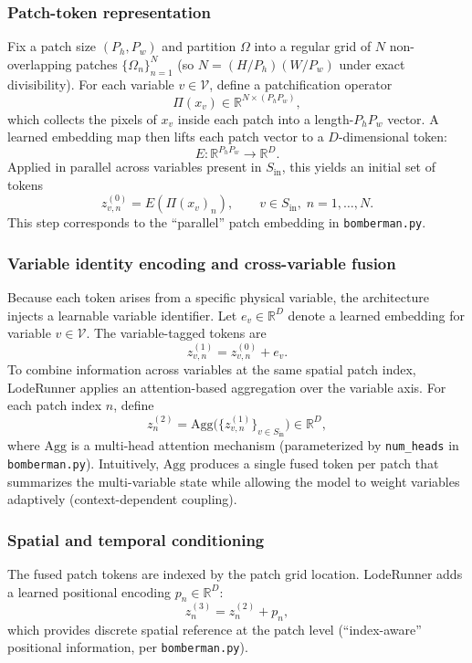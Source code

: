 \documentclass{article} %
\begin{document}
\subsubsection{Patch-token representation}
\label{subsec:patch_token_math}
Fix a patch size $(P_h,P_w)$ and partition $\Omega$ into a regular grid of $N$ non-overlapping patches $\{ \Omega_n \}_{n=1}^N$ (so $N=(H/P_h)(W/P_w)$ under exact divisibility). For each variable $v\in \mathcal{V}$, define a patchification operator
\[
\Pi(x_v) \in \mathbb{R}^{N \times (P_hP_w)},
\]
which collects the pixels of $x_v$ inside each patch into a length-$P_hP_w$ vector. A learned embedding map then lifts each patch vector to a $D$-dimensional token:
\[
E:\mathbb{R}^{P_hP_w}\to \mathbb{R}^D.
\]
Applied in parallel across variables present in $S_{\mathrm{in}}$, this yields an initial set of tokens
\[
z^{(0)}_{v,n} = E(\Pi(x_v)_n),\qquad v\in S_{\mathrm{in}},\; n=1,\dots,N.
\]
This step corresponds to the ``parallel'' patch embedding in \texttt{bomberman.py}.

\subsubsection{Variable identity encoding and cross-variable fusion}
\label{subsec:var_fusion_math}
Because each token arises from a specific physical variable, the architecture injects a learnable variable identifier. Let $e_v\in\mathbb{R}^D$ denote a learned embedding for variable $v\in\mathcal{V}$. The variable-tagged tokens are
\[
z^{(1)}_{v,n} = z^{(0)}_{v,n} + e_v.
\]
To combine information across variables at the same spatial patch index, LodeRunner applies an attention-based aggregation over the variable axis. For each patch index $n$, define
\[
z^{(2)}_n = \mathrm{Agg}\big(\{z^{(1)}_{v,n}\}_{v\in S_{\mathrm{in}}}\big)\in\mathbb{R}^D,
\]
where $\mathrm{Agg}$ is a multi-head attention mechanism (parameterized by \texttt{num\_heads} in \texttt{bomberman.py}). Intuitively, $\mathrm{Agg}$ produces a single fused token per patch that summarizes the multi-variable state while allowing the model to weight variables adaptively (context-dependent coupling).

\subsubsection{Spatial and temporal conditioning}
\label{subsec:pos_time_math}
The fused patch tokens are indexed by the patch grid location. LodeRunner adds a learned positional encoding $p_n\in\mathbb{R}^D$:
\[
z^{(3)}_n = z^{(2)}_n + p_n,
\]
which provides discrete spatial reference at the patch level (``index-aware'' positional information, per \texttt{bomberman.py}).
\end{document}
